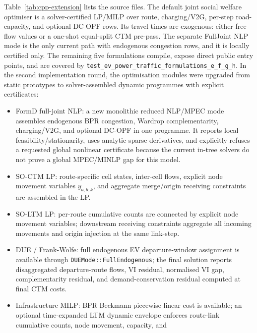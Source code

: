 \begin{remark}
  Table~\ref{tab:cpp-extension} lists the source files.
  The default joint social welfare optimiser is a solver-certified LP/MILP
  over route, charging/V2G, per-step road-capacity, and optional DC-OPF rows.
  Its travel times are exogenous: either free-flow values or a one-shot
  equal-split CTM pre-pass.  The separate FullJoint NLP mode is the only
  current path with endogenous congestion rows, and it is locally certified
  only.  The remaining five formulations compile, expose direct
  public entry points, and are covered by
  \texttt{test\_ev\_power\_traffic\_formulations\_e\_f\_g\_h}.  In the
  second implementation round, the optimisation modules were upgraded from
  static prototypes to solver-assembled dynamic programmes with explicit
  certificates:
  \begin{itemize}
    \item FormD full-joint NLP: a new monolithic reduced NLP/MPEC mode
          assembles endogenous BPR congestion, Wardrop complementarity,
          charging/V2G, and optional DC-OPF in one programme.  It reports
          local feasibility/stationarity, uses analytic sparse derivatives,
          and explicitly refuses a requested global nonlinear certificate
          because the current in-tree solvers do not prove a global
          MPEC/MINLP gap for this model.
    \item SO-CTM LP: route-specific cell states, inter-cell flows, explicit
          node movement variables $y_{a,b,k}$, and aggregate merge/origin
          receiving constraints are assembled in the LP.
    \item SO-LTM LP: per-route cumulative counts are connected by explicit
          node movement variables; downstream receiving constraints aggregate
          all incoming movements and origin injection at the same link-step.
    \item DUE / Frank-Wolfe: full endogenous EV departure-window assignment
          is available through \texttt{DUEMode::FullEndogenous}; the final
          solution reports disaggregated departure-route flows, VI residual,
          normalised VI gap, complementarity residual, and demand-conservation
          residual computed at final CTM costs.
    \item Infrastructure MILP: BPR Beckmann piecewise-linear cost is
          available; an optional time-expanded LTM dynamic envelope enforces
          route-link cumulative counts, node movement, capacity, and

\end{itemize}
\end{remark}
